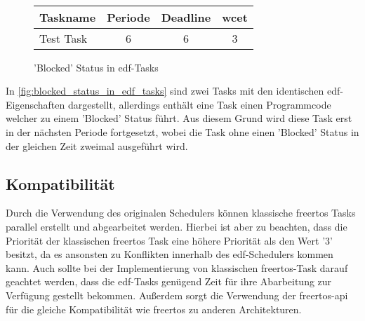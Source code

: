 \documentclass[../EDF Master Thesis.tex]{subfiles}
\begin{document}
\begin{figure}[H]
\\

        \vspace {0.5cm}
        \begin{tabular}{l|c|c|c}
            Taskname & Periode & Deadline & \ac{wcet} \\
            \hline
            Test Task & 6 & 6 & 3 \\
        \end{tabular}
        \caption{'Blocked' Status in \ac{edf}-Tasks}
        \label{fig:blocked_status_in_edf_tasks}
    \end{figure}

    In \autoref{fig:blocked_status_in_edf_tasks} sind zwei Tasks mit den identischen \ac{edf}-Eigenschaften dargestellt, allerdings enthält eine Task einen Programmcode welcher zu einem 'Blocked' Status führt.
    Aus diesem Grund wird diese Task erst in der nächsten Periode fortgesetzt, wobei die Task ohne einen 'Blocked' Status in der gleichen Zeit zweimal ausgeführt wird.


\subsection{Kompatibilität}

    Durch die Verwendung des originalen Schedulers können klassische \ac{freertos} Tasks parallel erstellt und abgearbeitet werden.
    Hierbei ist aber zu beachten, dass die Priorität der klassischen \ac{freertos} Task eine höhere Priorität als den Wert '3' besitzt, da es ansonsten zu Konflikten innerhalb des \ac{edf}-Schedulers kommen kann.
    Auch sollte bei der Implementierung von klassischen \ac{freertos}-Task darauf geachtet werden, dass die \ac{edf}-Tasks genügend Zeit für ihre Abarbeitung zur Verfügung gestellt bekommen.
    Außerdem sorgt die Verwendung der \ac{freertos}-\ac{api} für die gleiche Kompatibilität wie \ac{freertos} zu anderen Architekturen. 
\end{document}
